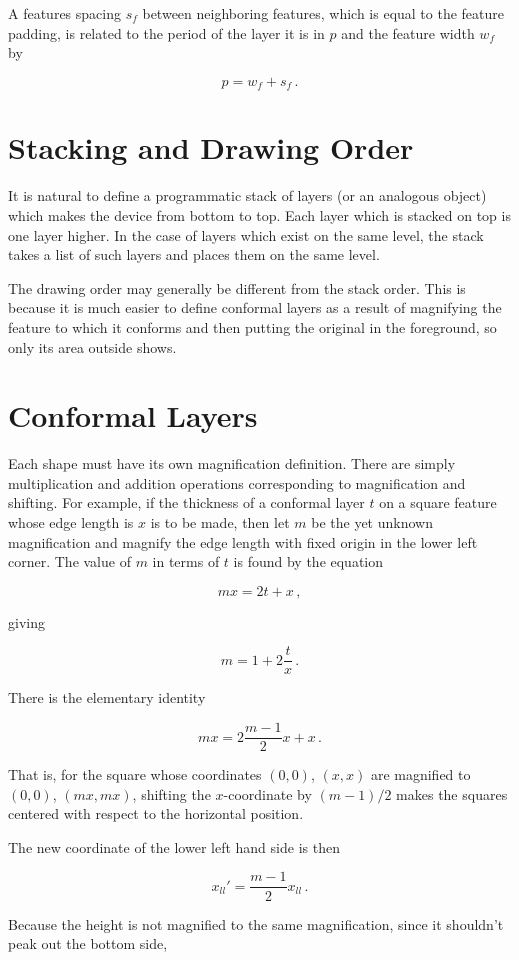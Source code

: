 \documentclass{article}
\begin{document}
A features spacing $s_f$ between neighboring features, which is equal to the feature padding, is related to the period of the layer it is in $p$ and the feature width $w_f$ by

$$p = w_f + s_f \,.$$

\section{Stacking and Drawing Order}
It is natural to define a programmatic stack of layers (or an analogous object) which makes the device from bottom to top. Each layer which is stacked on top is one layer higher. In the case of layers which exist on the same level, the stack takes a list of such layers and places them on the same level.

The drawing order may generally be different from the stack order. This is because it is much easier to define conformal layers as a result of magnifying the feature to which it conforms and then putting the original in the foreground, so only its area outside shows.

\section{Conformal Layers}
Each shape must have its own magnification definition. There are simply multiplication and addition operations corresponding to magnification and shifting. For example, if the thickness of a conformal layer $t$ on a square feature whose edge length is $x$ is to be made, then let $m$ be the yet unknown magnification and magnify the edge length with fixed origin in the lower left corner. The value of $m$ in terms of $t$ is found by the equation

$$ m x = 2t + x\,, $$

giving

$$ m = 1 + 2 \frac tx \,.$$

There is the elementary identity

$$mx = 2 \frac{m-1}{2} x + x \,. $$

That is, for the square whose coordinates $(0,0)$, $(x,x)$ are magnified to $(0,0)$, $(mx,mx)$, shifting the $x$-coordinate by $(m-1)/2$ makes the squares centered with respect to the horizontal position.

The new coordinate of the lower left hand side is then 

$$x_{ll}' = \frac{m-1}{2} x_{ll} \,. $$

Because the height is not magnified to the same magnification, since it shouldn't peak out the bottom side,
\end{document}
